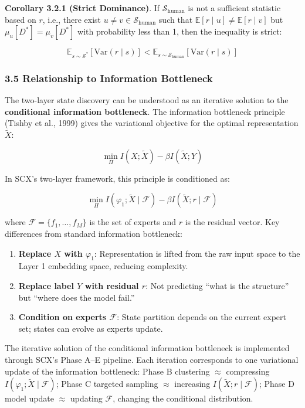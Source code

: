 \documentclass[
  12pt,
]{article}
\providecommand{\tightlist}{%
  \setlength{\itemsep}{0pt}\setlength{\parskip}{0pt}}
\begin{document}
\textbf{Corollary 3.2.1 (Strict Dominance)}. If $\mathcal{S}_{\text{human}}$ is not a sufficient statistic based on $r$, i.e., there exist $u \neq v \in \mathcal{S}_{\text{human}}$ such that $\mathbb{E}[r \mid u] \neq \mathbb{E}[r \mid v]$ but $\mu_u[D^*] = \mu_v[D^*]$ with probability less than 1, then the inequality is strict:

\[\mathbb{E}_{s \sim \mathcal{S}^*}[\text{Var}(r \mid s)] < \mathbb{E}_{s \sim \mathcal{S}_{\text{human}}}[\text{Var}(r \mid s)]\]

\subsubsection{3.5 Relationship to Information Bottleneck}\label{relationship-to-information-bottleneck}

The two-layer state discovery can be understood as an iterative solution to the \textbf{conditional information bottleneck}. The information bottleneck principle (Tishby et al., 1999) gives the variational objective for the optimal representation $\tilde{X}$:

\[\min_{\Pi} I(X; \tilde{X}) - \beta I(\tilde{X}; Y)\]

In SCX's two-layer framework, this principle is conditioned as:

\[\min_{\Pi} I(\varphi_1; \tilde{X} \mid \mathcal{F}) - \beta I(\tilde{X}; r \mid \mathcal{F})\]

where $\mathcal{F} = \{f_1, \dots, f_M\}$ is the set of experts and $r$ is the residual vector. Key differences from standard information bottleneck:

\begin{enumerate}
\def\labelenumi{\arabic{enumi}.}
\tightlist
\item
  \textbf{Replace $X$ with $\varphi_1$}: Representation is lifted from the raw input space to the Layer 1 embedding space, reducing complexity.
\item
  \textbf{Replace label $Y$ with residual $r$}: Not predicting ``what is the structure'' but ``where does the model fail.''
\item
  \textbf{Condition on experts $\mathcal{F}$}: State partition depends on the current expert set; states can evolve as experts update.
\end{enumerate}

The iterative solution of the conditional information bottleneck is implemented through SCX's Phase A--E pipeline. Each iteration corresponds to one variational update of the information bottleneck: Phase B clustering $\approx$ compressing $I(\varphi_1; \tilde{X} \mid \mathcal{F})$; Phase C targeted sampling $\approx$ increasing $I(\tilde{X}; r \mid \mathcal{F})$; Phase D model update $\approx$ updating $\mathcal{F}$, changing the conditional distribution.
\end{document}
